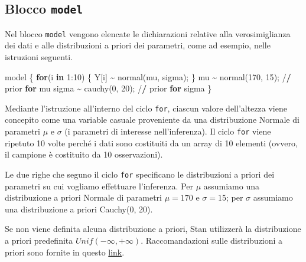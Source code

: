 \documentclass[
]{memoir}
\newenvironment{Shaded}{\begin{snugshade}}{\end{snugshade}}
\newcommand{\ControlFlowTok}[1]{\textcolor[rgb]{0.13,0.29,0.53}{\textbf{#1}}}
\newcommand{\DecValTok}[1]{\textcolor[rgb]{0.00,0.00,0.81}{#1}}
\newcommand{\ErrorTok}[1]{\textcolor[rgb]{0.64,0.00,0.00}{\textbf{#1}}}
\newcommand{\FunctionTok}[1]{\textcolor[rgb]{0.00,0.00,0.00}{#1}}
\newcommand{\NormalTok}[1]{#1}
\newcommand{\SpecialCharTok}[1]{\textcolor[rgb]{0.00,0.00,0.00}{#1}}
\begin{document}
\hypertarget{blocco-model}{%
\subsection{\texorpdfstring{Blocco \texttt{model}}{Blocco model}}\label{blocco-model}}

Nel blocco \texttt{model} vengono elencate le dichiarazioni relative alla verosimiglianza dei dati e alle distribuzioni a priori dei parametri, come ad esempio, nelle istruzioni seguenti.

\begin{Shaded}
\begin{Highlighting}[]
\NormalTok{model \{}
  \ControlFlowTok{for}\NormalTok{(i }\ControlFlowTok{in} \DecValTok{1}\SpecialCharTok{:}\DecValTok{10}\NormalTok{) \{}
\NormalTok{    Y[i] }\SpecialCharTok{\textasciitilde{}} \FunctionTok{normal}\NormalTok{(mu, sigma);}
\NormalTok{  \}}
\NormalTok{  mu }\SpecialCharTok{\textasciitilde{}} \FunctionTok{normal}\NormalTok{(}\DecValTok{170}\NormalTok{, }\DecValTok{15}\NormalTok{); }\SpecialCharTok{/}\ErrorTok{/}\NormalTok{ prior }\ControlFlowTok{for}\NormalTok{ mu}
\NormalTok{  sigma }\SpecialCharTok{\textasciitilde{}} \FunctionTok{cauchy}\NormalTok{(}\DecValTok{0}\NormalTok{, }\DecValTok{20}\NormalTok{); }\SpecialCharTok{/}\ErrorTok{/}\NormalTok{ prior }\ControlFlowTok{for}\NormalTok{ sigma}
\NormalTok{\}}
\end{Highlighting}
\end{Shaded}

\noindent
Mediante l'istruzione all'interno del ciclo \texttt{for}, ciascun valore dell'altezza viene concepito come una variable casuale proveniente da una distribuzione Normale di parametri \(\mu\) e \(\sigma\) (i parametri di interesse nell'inferenza). Il ciclo \texttt{for} viene ripetuto 10 volte perché i dati sono costituiti da un array di 10 elementi (ovvero, il campione è costituito da 10 osservazioni).

Le due righe che seguno il ciclo \texttt{for} specificano le distribuzioni a priori dei parametri su cui vogliamo effettuare l'inferenza. Per \(\mu\) assumiamo una distribuzione a priori Normale di parametri \(\mu = 170\) e \(\sigma = 15\); per \(\sigma\) assumiamo una distribuzione a priori Cauchy(0, 20).

Se non viene definita alcuna distribuzione a priori, Stan utilizzerà la distribuzione a priori predefinita \(Unif(-\infty, +\infty)\). Raccomandazioni sulle distribuzioni a priori sono fornite in questo \href{https://github.com/stan-dev/stan/wiki/Prior-Choice-Recommendations}{link}.
\end{document}
